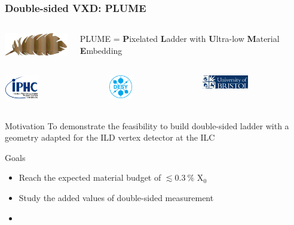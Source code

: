 \documentclass{beamer}
\begin{document}
\begin{frame}
  \frametitle{Double-sided VXD: PLUME}

  \begin{columns}[c]
    \begin{column}{3cm}
      \includegraphics[width = 3cm]{Pictures/logo_plume.png}
    \end{column}
    \vspace{-0.2cm}
    \begin{column}{7cm}
      PLUME = \textbf{P}ixelated \textbf{L}adder with \textbf{U}ltra-low \textbf{M}aterial \textbf{E}mbedding
    \end{column}
  \end{columns}

  \begin{columns}[t]
    \begin{column}{1cm}
      \includegraphics[width = 1.5cm]{Pictures/logo_IPHC_10cm.png}
    \end{column}
    \begin{column}{1cm}
      \includegraphics[width = 1cm]{Pictures/DESY-Logo.png}
    \end{column}
    \begin{column}{1cm}
      \includegraphics[width = 2cm]{Pictures/logo_uni_bristol.jpg}
    \end{column}
  \end{columns}

  \vspace{-0.15cm}

  \begin{block}{Motivation}
    To demonstrate the feasibility to build double-sided ladder with a geometry adapted for the ILD vertex detector at the ILC
  \end{block}

  \begin{block}{Goals}
    \begin{itemize}
      \item Reach the expected material budget of $ \lesssim 0.3~\%$ X$_0$
      \item Study the added values of double-sided measurement
      \item {} 
    \end{itemize}
  \end{block}


\end{frame}
\end{document}
